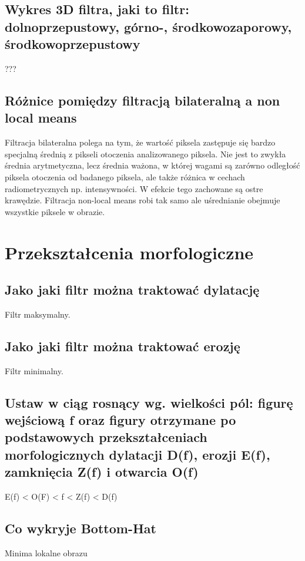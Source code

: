 \documentclass[a4paper, 12pt, titlepage]{article}
\begin{document}
\subsection{Wykres 3D filtra, jaki to filtr: dolnoprzepustowy, górno-, środkowozaporowy, środkowoprzepustowy}
???

\subsection{Różnice pomiędzy filtracją bilateralną a non local means}
Filtracja bilateralna polega na tym, że wartość piksela zastępuje się bardzo specjalną średnią z pikseli otoczenia analizowanego piksela. Nie jest to zwykła średnia arytmetyczna, lecz średnia ważona, w której wagami są zarówno odległość piksela otoczenia od badanego piksela, ale także różnica w cechach radiometrycznych np. intensywności. W efekcie tego zachowane są ostre krawędzie. 
Filtracja non-local means robi tak samo ale uśrednianie obejmuje wszystkie piksele w obrazie. 
\pagebreak\section{Przekształcenia morfologiczne}

\subsection{Jako jaki filtr można traktować dylatację}
Filtr maksymalny.

\subsection{Jako jaki filtr można traktować erozję}
Filtr minimalny.

\subsection{Ustaw w ciąg rosnący wg. wielkości pól: figurę wejściową f oraz figury otrzymane po podstawowych przekształceniach morfologicznych dylatacji D(f), erozji E(f), zamknięcia Z(f) i otwarcia O(f)}
E(f) < O(F) < f < Z(f) < D(f)

\subsection{Co wykryje Bottom-Hat}
Minima lokalne obrazu
\end{document}
